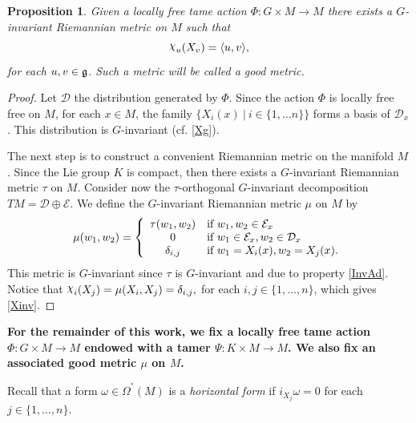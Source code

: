 \documentclass[a4paper,oneside,10pt,reqno]{amsart}
\newtheorem{proposition}[theorem]{Proposition}
\theoremstyle{definition}
\newcommand{\g}{\noindent {\mathfrak{g}}}
\newcommand{\tq}{\ \big| \ }
\newcommand\chii{\raise2pt\hbox{$\chi$}}
\newcommand\Om{\Omega}
\newcommand{\coho}[3]{{#1}^{^{#2}}{\left( #3 \right)}}
\begin{document}
\begin{proposition}\label{goodmetric}
Given a locally free tame action $\Phi \colon G \times M \to M$ there exists a $G$-invariant Riemannian metric on $M$ such that
\begin{equation}\label{Xinv}
\chii_{u} (X_v) =  \langle u,v\rangle,
\end{equation}
for each $u,v\in \g$. Such a metric will be called a  \emph{ good metric}.
\end{proposition} 
\begin{proof}
 Let $\mathcal{D}$ the distribution generated by $\Phi$.
 Since the action  $\Phi$  is locally free free  on $M$, for each $x\in M$, the  family $\{ X_i(x) \tq i\in \{1, \ldots n\}\}$  forms a basis of $\mathcal{D}_x$. This distribution is $G$-invariant (cf. \eqref{Xg}).

The next step is to construct a convenient Riemannian  metric on the manifold $M$. Since the Lie group $K$ is compact, then there exists a $G$-invariant Riemannian  metric $\tau$ on $M$.
Consider  now the $\tau$-orthogonal
$G$-invariant decomposition
$
T M=  \mathcal{D} \oplus \mathcal{E}.
$
We define the $G$-invariant Riemannian  metric $\mu$ on $ M$ by 
$$
\mu (w_1, w_2) =
\left\{
\begin{array}{cl}
\tau(w_1,w_2) & \hbox{if } w_1,w_2 \in  \mathcal{E}_x \\
0 & \hbox{if } w_1 \in  \mathcal{E}_x, w_2 \in\mathcal{D}_x \\
\delta_{i,j}& \hbox{if } w_1 = X_i(x), w_2 = X_j(x).
\end{array}
\right.
$$
 This metric is $G$-invariant since $\tau$ is $G$-invariant and due to  property \eqref{InvAd}.
Notice that
$
\chii_{i} (X_j) = \mu (X_i,X_j)=  \delta_{i,j},
$
for each $i,j\in\{1,\ldots,n\}$, which gives \eqref{Xinv}.
\end{proof}

\bigskip

{\bf For the remainder of this work, we  fix  a locally free tame action $\Phi \colon G \times M \to M$ endowed with a tamer 
$\Psi \colon K \times M \to M$. We also fix an associated  good metric $\mu$ on $M$.}


\bigskip

Recall that a form $\omega \in \coho \Om * M$  is a {\em horizontal form} if $i_{X_j} \omega =0$ for each $j\in \{1,\ldots,n\}$.
\end{document}
